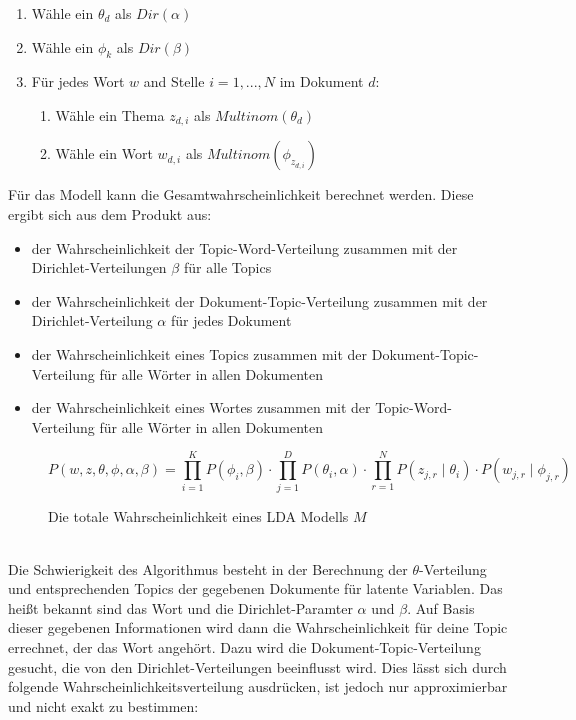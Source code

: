 \documentclass[german,version-2020-11]{uzl-thesis}
\begin{document}
\begin{enumerate}
	\item Wähle ein $\theta_d$ als $Dir(\alpha)$
	\item Wähle ein $\phi_k$ als $Dir(\beta)$
	\item Für jedes Wort $w$ and Stelle $i = 1,...,N$ im Dokument $d$: 
	\begin{enumerate}
		\item Wähle ein Thema $z_{d,i}$ als $Multinom(\theta_d)$
		\item Wähle ein Wort $w_{d,i}$ als $Multinom(\phi_z_{d,i})$
	\end{enumerate}
\end{enumerate}

Für das Modell kann die Gesamtwahrscheinlichkeit berechnet werden. Diese ergibt sich aus dem Produkt aus: 
\begin{itemize}
\item der Wahrscheinlichkeit der Topic-Word-Verteilung zusammen mit der Dirichlet-Verteilungen $\beta$ für alle Topics
\item der Wahrscheinlichkeit der Dokument-Topic-Verteilung zusammen mit der Dirichlet-Verteilung $\alpha$ für jedes Dokument
\item der Wahrscheinlichkeit eines Topics zusammen mit der Dokument-Topic-Verteilung für alle Wörter in allen Dokumenten
\item der Wahrscheinlichkeit eines Wortes zusammen mit der Topic-Word-Verteilung für alle Wörter in allen Dokumenten
\end{itemize}

\begin{figure}[h]
\begin{center}
\begin{equation}
P(w,z,\theta, \phi, \alpha, \beta) = \prod_{i=1}^{K} P(\phi_i, \beta) \cdot \prod_{j=1}^{D}P(\theta_i, \alpha) \cdot \prod_{r=1}^{N} P(z_{j,r}\mid\theta_i) \cdot P(w_{j,r} \mid \phi_{j,r}) 
\end{equation}
\end{center}
\caption{Die totale Wahrscheinlichkeit eines LDA Modells $M$}
\label{fig:equ1}
\end{figure}
\\


Die Schwierigkeit des Algorithmus besteht in der Berechnung der $\theta$-Verteilung und entsprechenden Topics der gegebenen Dokumente für latente Variablen. Das heißt bekannt sind das Wort und die Dirichlet-Paramter $\alpha$ und $\beta$. Auf Basis dieser gegebenen Informationen wird dann die Wahrscheinlichkeit für deine Topic errechnet, der das Wort angehört. Dazu wird die Dokument-Topic-Verteilung gesucht, die von den Dirichlet-Verteilungen beeinflusst wird. Dies lässt sich durch folgende Wahrscheinlichkeitsverteilung ausdrücken, ist jedoch nur approximierbar und nicht exakt zu bestimmen: \\
\end{document}
